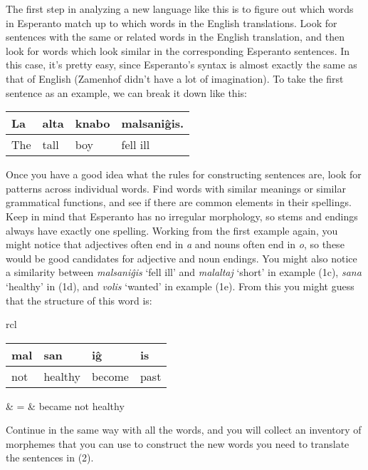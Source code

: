 \documentclass[11pt]{article}
\begin{document}
The first step in analyzing a new language like this is to figure out which
words in Esperanto match up to which words in the English translations. Look
for sentences with the same or related words in the English translation, and
then look for words which look similar in the corresponding Esperanto
sentences.  In this case, it's pretty easy, since Esperanto's syntax is almost
exactly the same as that of English (Zamenhof didn't have a lot of
imagination).  To take the first sentence as an example, we can break it down
like this:
\begin{center}
\begin{tabular}{|l|l|l|l|}
\hline
La & alta & knabo & malsani\^gis.\\
\hline
The & tall & boy & fell ill\\
\hline
\end{tabular}
\end{center}
Once you have a good idea what the rules for constructing sentences are, look
for patterns across individual words.  Find words with similar meanings or
similar grammatical functions, and see if there are common elements in their
spellings. Keep in mind that Esperanto has no irregular morphology, so stems
and endings always have exactly one spelling.  Working from the first example
again, you might notice that adjectives often end in \emph{a} and nouns often
end in \emph{o}, so these would be good candidates for adjective and noun
endings. You might also notice a similarity between \emph{malsani\^gis} `fell
ill' and \emph{malaltaj} `short' in example (1c), \emph{sana} `healthy' in
(1d), and \emph{volis} `wanted' in example (1e).  From this you might guess
that the structure of this word is:
\begin{center}
\begin{tabular}{rcl}
\begin{tabular}{|l|l|l|l|}
\hline
mal & san & i\^g & is\\
\hline
not & healthy & become & past\\
\hline
\end{tabular}  & = & became not healthy
\end{tabular}
\end{center}
Continue in the same way with all the words, and you will collect an inventory
of morphemes that you can use to construct the new words you need to translate
the sentences in (2).
 
\end{document}

